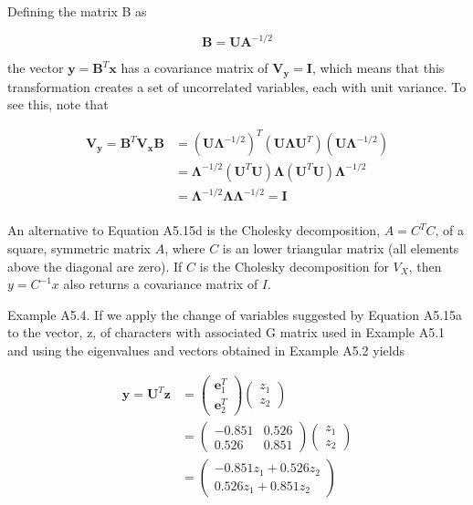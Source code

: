 \documentclass{article}
\begin{document}
Defining the matrix B as

\begin{equation}
\mathbf{B}=\mathbf{U}\boldsymbol{A}^{-1/2}
\end{equation}

the vector  $ \mathbf{y} = \mathbf{B}^T \mathbf{x} $ has a covariance matrix of  $ \mathbf{V}_{\mathbf{y}} = \mathbf{I} $, which means that this transformation creates a set of uncorrelated variables, each with unit variance. To see this, note that

\begin{equation}
\begin{aligned}\mathbf{V}_{\mathbf{y}}=\mathbf{B}^{T}\mathbf{V}_{\mathbf{x}}\mathbf{B}&=\left(\mathbf{U}\boldsymbol{\Lambda}^{-1/2}\right)^{T}\left(\mathbf{U}\boldsymbol{\Lambda}\mathbf{U}^{T}\right)\left(\mathbf{U}\boldsymbol{\Lambda}^{-1/2}\right)\\&=\boldsymbol{\Lambda}^{-1/2}\left(\mathbf{U}^{T}\mathbf{U}\right)\boldsymbol{\Lambda}\left(\mathbf{U}^{T}\mathbf{U}\right)\boldsymbol{\Lambda}^{-1/2}\\&=\boldsymbol{\Lambda}^{-1/2}\boldsymbol{\Lambda}\boldsymbol{\Lambda}^{-1/2}=\mathbf{I}\\ \end{aligned}
\end{equation}

An alternative to Equation A5.15d is the Cholesky decomposition,  $ A = C^T C $, of a square, symmetric matrix  $ A $, where  $ C $ is an lower triangular matrix (all elements above the diagonal are zero). If  $ C $ is the Cholesky decomposition for  $ V_X $, then  $ y = C^{-1} x $ also returns a covariance matrix of  $ I $.

Example A5.4. If we apply the change of variables suggested by Equation A5.15a to the vector, z, of characters with associated G matrix used in Example A5.1 and using the eigenvalues and vectors obtained in Example A5.2 yields

\begin{equation}
\begin{aligned}\mathbf{y}=\mathbf{U}^{T}\mathbf{z}&=\begin{pmatrix}\mathbf{e}_{1}^{T}\\\mathbf{e}_{2}^{T}\end{pmatrix}\begin{pmatrix}z_{1}\\z_{2}\end{pmatrix}\\&=\begin{pmatrix}-0.851&0.526\\0.526&0.851\end{pmatrix}\begin{pmatrix}z_{1}\\z_{2}\end{pmatrix}\\&=\begin{pmatrix}-0.851z_{1}+0.526z_{2}\\0.526z_{1}+0.851z_{2}\end{pmatrix}\end{aligned}
\end{equation}
\end{document}
